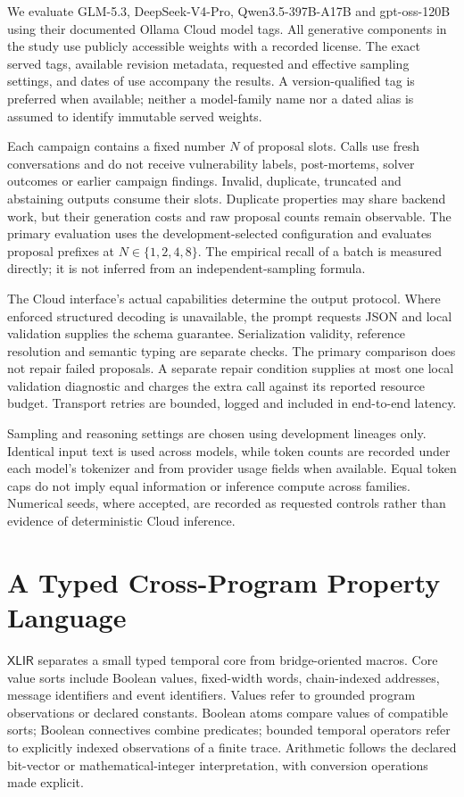 \documentclass[journal]{IEEEtran}
\theoremstyle{definition}
\newcommand{\xlir}{\ensuremath{\mathsf{XLIR}}}
\begin{document}
We evaluate GLM-5.3, DeepSeek-V4-Pro, Qwen3.5-397B-A17B and gpt-oss-120B using their documented Ollama Cloud model tags. All generative components in the study use publicly accessible weights with a recorded license. The exact served tags, available revision metadata, requested and effective sampling settings, and dates of use accompany the results. A version-qualified tag is preferred when available; neither a model-family name nor a dated alias is assumed to identify immutable served weights.

Each campaign contains a fixed number $N$ of proposal slots. Calls use fresh conversations and do not receive vulnerability labels, post-mortems, solver outcomes or earlier campaign findings. Invalid, duplicate, truncated and abstaining outputs consume their slots. Duplicate properties may share backend work, but their generation costs and raw proposal counts remain observable. The primary evaluation uses the development-selected configuration and evaluates proposal prefixes at $N\in\{1,2,4,8\}$. The empirical recall of a batch is measured directly; it is not inferred from an independent-sampling formula.

The Cloud interface's actual capabilities determine the output protocol. Where enforced structured decoding is unavailable, the prompt requests JSON and local validation supplies the schema guarantee. Serialization validity, reference resolution and semantic typing are separate checks. The primary comparison does not repair failed proposals. A separate repair condition supplies at most one local validation diagnostic and charges the extra call against its reported resource budget. Transport retries are bounded, logged and included in end-to-end latency.

Sampling and reasoning settings are chosen using development lineages only. Identical input text is used across models, while token counts are recorded under each model's tokenizer and from provider usage fields when available. Equal token caps do not imply equal information or inference compute across families. Numerical seeds, where accepted, are recorded as requested controls rather than evidence of deterministic Cloud inference.

\section{A Typed Cross-Program Property Language}
\label{sec:xlir-v2}

$\xlir$ separates a small typed temporal core from bridge-oriented macros. Core value sorts include Boolean values, fixed-width words, chain-indexed addresses, message identifiers and event identifiers. Values refer to grounded program observations or declared constants. Boolean atoms compare values of compatible sorts; Boolean connectives combine predicates; bounded temporal operators refer to explicitly indexed observations of a finite trace. Arithmetic follows the declared bit-vector or mathematical-integer interpretation, with conversion operations made explicit.
\end{document}
